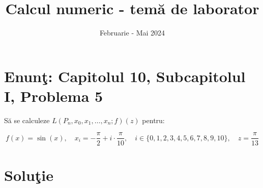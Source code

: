 \documentclass{article}
\begin{document}
\title{Calcul numeric - tem\u{a} de laborator}

\author{}

\date{Februarie - Mai 2024}

\maketitle              %








\section*{Enun\c{t}: Capitolul 10, Subcapitolul I, Problema 5}

S\u{a} se calculeze $L(P_n, x_0, x_1, \ldots, x_n; f)(z)$ pentru:

\begin{center}
\[
f(x) = \sin(x),
\quad x_i = -\frac{\pi}{2} + i \cdot \frac{\pi}{10},
\quad i \in \{0, 1, 2, 3, 4, 5, 6, 7, 8, 9, 10\},
\quad z = \frac{\pi}{13}
\] 

\end{center}

\section*{Solu\c{t}ie}
\end{document}
